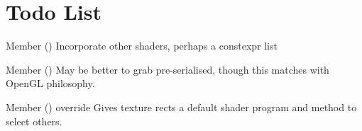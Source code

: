 \chapter{Todo List}
\hypertarget{todo}{}\label{todo}

\begin{DoxyRefList}
\item[Member \doxylink{classApp_a26c8801e7a5375be8b96453ae0a7f451}{App\+::Create\+Graphics\+Pipeline} ()]\label{todo__todo000001}%
%
Incorporate other shaders, perhaps a constexpr list  
\item[Member \doxylink{classApp_a02e8ddeeef85c9d26e412dde846dcaca}{App\+::Generate\+Fonts} ()]\label{todo__todo000002}%
%
May be better to grab pre-\/serialised, though this matches with Open\+GL philosophy.  
\item[Member \doxylink{classTexturedRect2D_aa37daeff9f2db40e9effbb737349e99e}{Textured\+Rect2D\+::Render} () override]\label{todo__todo000003}%
%
Gives texture rects a default shader program and method to select others. 
\end{DoxyRefList}